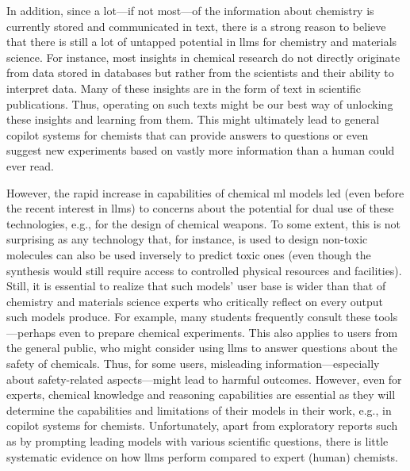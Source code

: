 \documentclass[11pt, oneside]{article}
\begin{document}
\begin{refsection}
In addition, since a lot---if not most---of the information about chemistry is currently stored and communicated in text, there is a strong reason to believe that there is still a lot of untapped potential in \glspl{llm} for chemistry and materials science.\autocite{miret2024llms}
For instance, most insights in chemical research do not directly originate from data stored in databases but rather from the scientists and their ability to interpret data.
Many of these insights are in the form of text in scientific publications.
Thus, operating on such texts might be our best way of unlocking these insights and learning from them.
This might ultimately lead to general copilot systems for chemists that can provide answers to questions or even suggest new experiments based on vastly more information than a human could ever read.

However, the rapid increase in capabilities of chemical \gls{ml} models led (even before the recent interest in \glspl{llm}) to concerns about the potential for dual use of these technologies, e.g., for the design of chemical weapons.\autocite{gopal2023releasing, ganguli2022red, Urbina_2022, campbell2023censoring, moulange2023towards, urbina2022teachable}
To some extent, this is not surprising as any technology that, for instance, is used to design non-toxic molecules can also be used inversely to predict toxic ones (even though the synthesis would still require access to controlled physical resources and facilities).
Still, it is essential to realize that such models' user base is wider than that of chemistry and materials science experts who critically reflect on every output such models produce.
For example, many students frequently consult these tools---perhaps even to prepare chemical experiments.\autocite{Intelligent.com_2023}
This also applies to users from the general public, who might consider using \glspl{llm} to answer questions about the safety of chemicals.
Thus, for some users, misleading information---especially about safety-related aspects---might lead to harmful outcomes.
However, even for experts, chemical knowledge and reasoning capabilities are essential as they will determine the capabilities and limitations of their models in their work, e.g., in copilot systems for chemists.
Unfortunately, apart from exploratory reports such as by prompting leading models with various scientific questions,\autocite{ai4science2023impact} there is little systematic evidence on how \glspl{llm} perform compared to expert (human) chemists.


\end{refsection}
\end{document}
